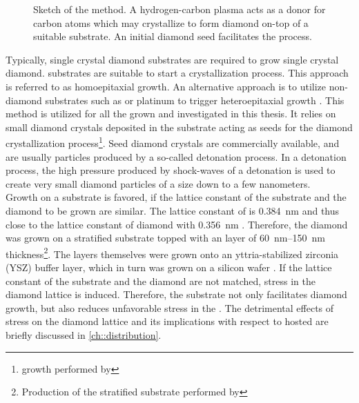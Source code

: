 	\begin{figure}[htp]
		\centering
		\caption[\CVD production method]{Sketch of the \CVD method. A hydrogen-carbon plasma acts as a donor for carbon atoms which may crystallize to form diamond on-top of a suitable \ir substrate. An initial diamond seed facilitates the process.}
		\label{fig::cvd_sketch}
	\end{figure}

	Typically, single crystal diamond substrates are required to grow single crystal diamond. \HPHT substrates are suitable to start a crystallization process. This approach is referred to as homoepitaxial growth. An alternative approach is to utilize non-diamond substrates such as \ir or platinum to trigger heteroepitaxial growth \cite{janine::142, neu::143}.
	This method is utilized for all the \CVD \nds grown and investigated in this thesis.
	It relies on small diamond crystals deposited in the substrate acting as seeds for the diamond crystallization process\footnote{\CVD \nd growth performed by \gsell}. Seed diamond crystals are commercially available, and are usually particles produced by a so-called detonation process.
	In a detonation process, the high pressure produced by shock-waves of a detonation is used to create very small diamond particles of a size down to a few nanometers.
	\\
	Growth on a substrate is favored, if the lattice constant of the substrate and the diamond to be grown are similar.
	The lattice constant of \ir is \SI{0.384}{nm} \cite{Arblaster2010,Gsell2007} and thus close to the lattice constant of diamond with \SI{0.356}{nm} \cite{Davis1993}.
	Therefore, the diamond was grown on a stratified substrate topped with an \ir layer of \SIrange{60}{150}{nm} thickness\footnote{Production of the stratified substrate performed by \gsell}. 
	The \ir layers themselves were grown onto an yttria-stabilized zirconia (YSZ) buffer layer, which in turn was grown on a silicon wafer \cite{Gsell2004a}.
	If the lattice constant of the substrate and the diamond are not matched, stress in the diamond lattice is induced.
	Therefore, the \ir substrate not only facilitates diamond growth, but also reduces unfavorable stress in the \nds. The detrimental effects of stress on the diamond lattice and its implications with respect to hosted \sivs are briefly discussed in \autoref{ch::distribution}.
